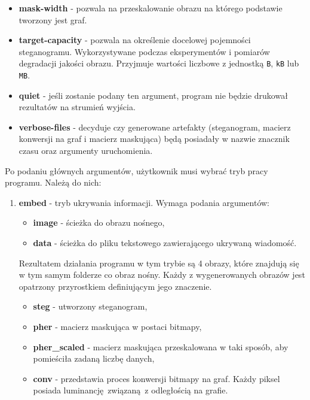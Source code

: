 {{{\begin{itemize}
                się zatrzymać.
                \item \textbf{mask-width} - pozwala na przeskalowanie obrazu na którego podstawie tworzony jest graf.
                \item \textbf{target-capacity} - pozwala na określenie docelowej pojemności steganogramu. Wykorzystywane
                podczas eksperymentów i pomiarów degradacji jakości obrazu. Przyjmuje wartości liczbowe z jednostką
                \texttt{B}, \texttt{kB} lub \texttt{MB}.
                \item \textbf{quiet} - jeśli zostanie podany ten argument, program nie będzie drukował rezultatów na
                strumień wyjścia.
                \item \textbf{verbose-files} - decyduje czy generowane artefakty (steganogram, macierz konwersji na
                graf i macierz maskująca) będą posiadały w nazwie znacznik czasu oraz argumenty uruchomienia.
            \end{itemize}


            Po podaniu głównych argumentów, użytkownik musi wybrać tryb pracy programu. Należą do nich:

            \begin{enumerate}
                \item \textbf{embed} - tryb ukrywania informacji. Wymaga podania argumentów:
                    \begin{itemize}
                        \item \textbf{image} - ścieżka do obrazu nośnego,
                        \item \textbf{data} - ścieżka do pliku tekstowego zawierającego ukrywaną wiadomość.
                    \end{itemize}

                    Rezultatem działania programu w tym trybie są 4 obrazy, które znajdują się w tym samym folderze co
                    obraz nośny. Każdy z wygenerowanych obrazów jest opatrzony przyrostkiem definiującym jego znaczenie.

                    \begin{itemize}
                        \item \textbf{steg} - utworzony steganogram,
                        \item \textbf{pher} - macierz maskująca w postaci bitmapy,
                        \item \textbf{pher\_scaled} - macierz maskująca przeskalowana w taki sposób, aby pomieściła
                        zadaną liczbę danych,
                        \item \textbf{conv} - przedstawia proces konwersji bitmapy na graf. Każdy piksel posiada
                        luminancję związaną z odległością na grafie.
                    \end{itemize}


\end{enumerate}}}}
